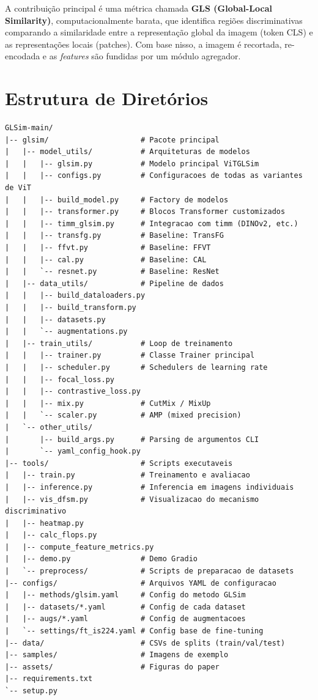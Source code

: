 \documentclass[a4paper,12pt]{scrartcl}
\begin{document}
A contribui\c{c}\~ao principal \'e uma m\'etrica chamada \textbf{GLS
(Global-Local Similarity)}, computacionalmente barata, que identifica regi\~oes
discriminativas comparando a similaridade entre a representa\c{c}\~ao global da
imagem (token CLS) e as representa\c{c}\~oes locais (patches). Com base nisso,
a imagem \'e recortada, re-encodada e as \textit{features} s\~ao fundidas por
um m\'odulo agregador.

\section{Estrutura de Diret\'orios}

\begin{lstlisting}[style=treestyle,
  caption={Estrutura de diret\'orios do reposit\'orio GLSim}]
GLSim-main/
|-- glsim/                     # Pacote principal
|   |-- model_utils/           # Arquiteturas de modelos
|   |   |-- glsim.py           # Modelo principal ViTGLSim
|   |   |-- configs.py         # Configuracoes de todas as variantes de ViT
|   |   |-- build_model.py     # Factory de modelos
|   |   |-- transformer.py     # Blocos Transformer customizados
|   |   |-- timm_glsim.py      # Integracao com timm (DINOv2, etc.)
|   |   |-- transfg.py         # Baseline: TransFG
|   |   |-- ffvt.py            # Baseline: FFVT
|   |   |-- cal.py             # Baseline: CAL
|   |   `-- resnet.py          # Baseline: ResNet
|   |-- data_utils/            # Pipeline de dados
|   |   |-- build_dataloaders.py
|   |   |-- build_transform.py
|   |   |-- datasets.py
|   |   `-- augmentations.py
|   |-- train_utils/           # Loop de treinamento
|   |   |-- trainer.py         # Classe Trainer principal
|   |   |-- scheduler.py       # Schedulers de learning rate
|   |   |-- focal_loss.py
|   |   |-- contrastive_loss.py
|   |   |-- mix.py             # CutMix / MixUp
|   |   `-- scaler.py          # AMP (mixed precision)
|   `-- other_utils/
|       |-- build_args.py      # Parsing de argumentos CLI
|       `-- yaml_config_hook.py
|-- tools/                     # Scripts executaveis
|   |-- train.py               # Treinamento e avaliacao
|   |-- inference.py           # Inferencia em imagens individuais
|   |-- vis_dfsm.py            # Visualizacao do mecanismo discriminativo
|   |-- heatmap.py
|   |-- calc_flops.py
|   |-- compute_feature_metrics.py
|   |-- demo.py                # Demo Gradio
|   `-- preprocess/            # Scripts de preparacao de datasets
|-- configs/                   # Arquivos YAML de configuracao
|   |-- methods/glsim.yaml     # Config do metodo GLSim
|   |-- datasets/*.yaml        # Config de cada dataset
|   |-- augs/*.yaml            # Config de augmentacoes
|   `-- settings/ft_is224.yaml # Config base de fine-tuning
|-- data/                      # CSVs de splits (train/val/test)
|-- samples/                   # Imagens de exemplo
|-- assets/                    # Figuras do paper
|-- requirements.txt
`-- setup.py
\end{lstlisting}
\end{document}

